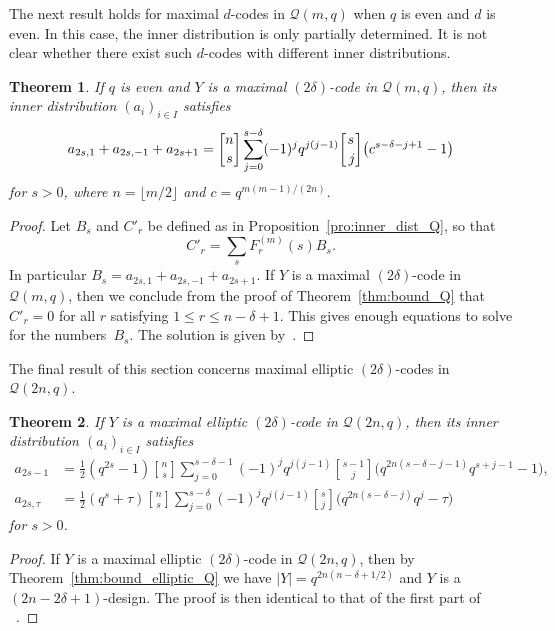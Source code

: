 \documentclass[10pt]{article}
\newtheorem{theorem}{Theorem}[section]
\theoremstyle{definition}
\newcommand{\Q}{\mathscr{Q}}
\renewcommand{\d}{\delta}
\renewcommand{\t}{\tau}
\newcommand{\abs}[1]{\lvert#1\rvert}
\newcommand{\floor}[1]{\lfloor#1\rfloor}
\begin{document}
\par
The next result holds for maximal $d$-codes in $\Q(m,q)$ when $q$ is even and $d$ is even. In this case, the inner distribution is only partially determined. It is not clear whether there exist such $d$-codes with different inner distributions.
\begin{theorem}
If $q$ is even and $Y$ is a maximal $(2\d)$-code in $\Q(m,q)$, then its inner distribution $(a_i)_{i\in I}$ satisfies
\[
\postdisplaypenalty1000000
a_{2s,1}+a_{2s,-1}+a_{2s+1}=\genfrac{[}{]}{0pt}{}{n}{s}\sum_{j=0}^{s-\d}(-1)^jq^{j(j-1)}\genfrac{[}{]}{0pt}{}{s}{\,j}\big(c^{s-\d-j+1}-1\big)
\]
for $s>0$, where $n=\floor{m/2}$ and $c=q^{m(m-1)/(2n)}$.
\end{theorem}
\begin{proof}
Let $B_s$ and $C'_r$ be defined as in Proposition~\ref{pro:inner_dist_Q}, so that
\[
C'_r=\sum_sF^{(m)}_r(s)B_s.
\]
In particular $B_s=a_{2s,1}+a_{2s,-1}+a_{2s+1}$. If $Y$ is a maximal $(2\d)$-code in $\Q(m,q)$, then we conclude from the proof of Theorem~\ref{thm:bound_Q} that $C'_r=0$ for all $r$ satisfying $1\le r\le n-\d+1$. This gives enough equations to solve for the numbers~$B_s$. The solution is given by~\cite[Lemma~3.8]{Sch2015}.
\end{proof}
\par
The final result of this section concerns maximal elliptic $(2\d)$-codes in $\Q(2n,q)$.
\begin{theorem}
\label{thm:inner_dist_elliptic}
If $Y$ is a maximal elliptic $(2\d)$-code in $\Q(2n,q)$, then its inner distribution $(a_i)_{i\in I}$ satisfies
\begin{align*}
a_{2s-1}&=\frac{1}{2}(q^{2s}-1)\genfrac{[}{]}{0pt}{}{n}{s}\sum_{j=0}^{s-\d-1}(-1)^jq^{j(j-1)}\genfrac{[}{]}{0pt}{}{s-1}{j}\big(q^{2n(s-\d-j-1)}q^{s+j-1}-1\big),\\%
a_{2s,\t}&=\frac{1}{2}(q^s+\t)\genfrac{[}{]}{0pt}{}{n}{s}\sum_{j=0}^{s-\d}(-1)^jq^{j(j-1)}\genfrac{[}{]}{0pt}{}{s}{j}\big(q^{2n(s-\d-j)}q^j-\t\big)
\end{align*}
for $s>0$. 
\end{theorem}
\begin{proof}
If $Y$ is a maximal elliptic $(2\d)$-code in $\Q(2n,q)$, then by Theorem~\ref{thm:bound_elliptic_Q} we have $\abs{Y}=q^{2n(n-\d+1/2)}$ and $Y$ is a $(2n-2\d+1)$-design. The proof is then identical to that of the first part of ~\cite[Proposition~3.10]{Sch2015}.
\end{proof}

%
\end{document}
